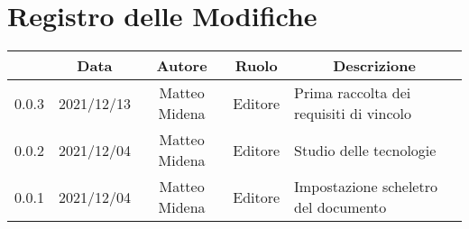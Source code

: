 \thispagestyle{empty}
\section*{Registro delle Modifiche}

\begin{center}
	\renewcommand{\arraystretch}{1.8}
	\begin{longtable}[c]{c | c | c | c | p{5cm}}
		\rowcolor[HTML]{125E28}
		\multicolumn{1}{c}{\color[HTML]{FFFFFF} \textbf{Versione}} & 
		\multicolumn{1}{c}{\color[HTML]{FFFFFF} \textbf{Data}} & 
		\multicolumn{1}{c}{\color[HTML]{FFFFFF} \textbf{Autore}} & 
		\multicolumn{1}{c}{\color[HTML]{FFFFFF} \textbf{Ruolo}} & 
		\multicolumn{1}{c}{\color[HTML]{FFFFFF} \textbf{Descrizione}} \\
		\endhead
		0.0.3 & 2021/12/13 & Matteo Midena & Editore & Prima raccolta dei requisiti di vincolo\\
		0.0.2 & 2021/12/04 & Matteo Midena & Editore & Studio delle tecnologie\\
		0.0.1 & 2021/12/04 & Matteo Midena & Editore & Impostazione scheletro del documento\\
	\end{longtable}
\end{center}
